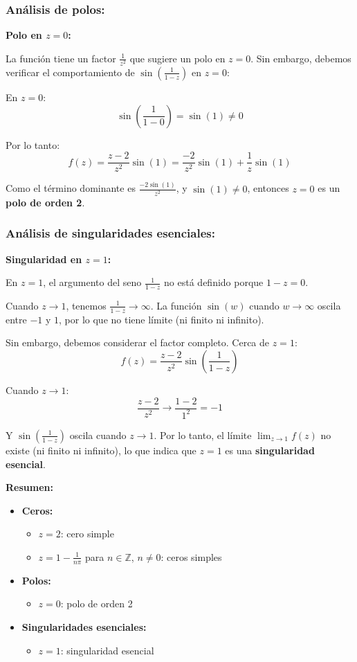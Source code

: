 \documentclass{article}
\begin{document}
\subsubsection*{Análisis de polos:}

\textbf{Polo en $z = 0$:}

La función tiene un factor $\frac{1}{z^2}$ que sugiere un polo en $z = 0$. Sin embargo, debemos verificar el comportamiento de $\sin\left(\frac{1}{1 - z}\right)$ en $z = 0$:

En $z = 0$:
$$\sin\left(\frac{1}{1 - 0}\right) = \sin(1) \neq 0$$

Por lo tanto:
$$f(z) = \frac{z - 2}{z^2} \sin(1) = \frac{-2}{z^2} \sin(1) + \frac{1}{z} \sin(1)$$

Como el término dominante es $\frac{-2\sin(1)}{z^2}$, y $\sin(1) \neq 0$, entonces $z = 0$ es un \textbf{polo de orden 2}.

\subsubsection*{Análisis de singularidades esenciales:}

\textbf{Singularidad en $z = 1$:}

En $z = 1$, el argumento del seno $\frac{1}{1 - z}$ no está definido porque $1 - z = 0$.

Cuando $z \to 1$, tenemos $\frac{1}{1 - z} \to \infty$. La función $\sin(w)$ cuando $w \to \infty$ oscila entre $-1$ y $1$, por lo que no tiene límite (ni finito ni infinito).

Sin embargo, debemos considerar el factor completo. Cerca de $z = 1$:
$$f(z) = \frac{z - 2}{z^2} \sin\left(\frac{1}{1 - z}\right)$$

Cuando $z \to 1$:
$$\frac{z - 2}{z^2} \to \frac{1 - 2}{1^2} = -1$$

Y $\sin\left(\frac{1}{1 - z}\right)$ oscila cuando $z \to 1$. Por lo tanto, el límite $\lim_{z \to 1} f(z)$ no existe (ni finito ni infinito), lo que indica que $z = 1$ es una \textbf{singularidad esencial}.

\textbf{Resumen:}
\begin{itemize}
\item \textbf{Ceros:}
  \begin{itemize}
  \item $z = 2$: cero simple
  \item $z = 1 - \frac{1}{n\pi}$ para $n \in \mathbb{Z}$, $n \neq 0$: ceros simples
  \end{itemize}
\item \textbf{Polos:}
  \begin{itemize}
  \item $z = 0$: polo de orden 2
  \end{itemize}
\item \textbf{Singularidades esenciales:}
  \begin{itemize}
  \item $z = 1$: singularidad esencial
  \end{itemize}
\end{itemize}
\end{document}
